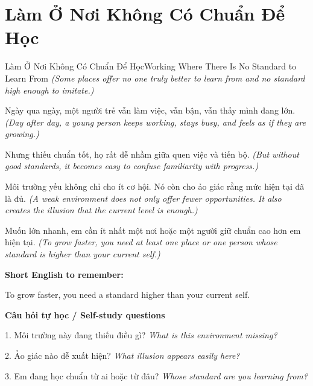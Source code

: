 \section{Làm Ở Nơi Không Có Chuẩn Để Học}
\begin{truyen}{Làm Ở Nơi Không Có Chuẩn Để Học}{Working Where There Is No Standard to Learn From}
\textit{(Some places offer no one truly better to learn from and no standard high enough to imitate.)}

Ngày qua ngày, một người trẻ vẫn làm việc, vẫn bận, vẫn thấy mình đang lớn.
\textit{(Day after day, a young person keeps working, stays busy, and feels as if they are growing.)}

Nhưng thiếu chuẩn tốt, họ rất dễ nhầm giữa quen việc và tiến bộ.
\textit{(But without good standards, it becomes easy to confuse familiarity with progress.)}

Môi trường yếu không chỉ cho ít cơ hội. Nó còn cho ảo giác rằng mức hiện tại đã là đủ.
\textit{(A weak environment does not only offer fewer opportunities. It also creates the illusion that the current level is enough.)}

\end{truyen}

\begin{baihoc}
Muốn lớn nhanh, em cần ít nhất một nơi hoặc một người giữ chuẩn cao hơn em hiện tại.
\textit{(To grow faster, you need at least one place or one person whose standard is higher than your current self.)}
\end{baihoc}

\begin{ghinhoanh}
\textbf{Short English to remember:}

To grow faster, you need a standard higher than your current self.

\end{ghinhoanh}

\begin{tuhocnhanh}
\textbf{Câu hỏi tự học / Self-study questions}

1. Môi trường này đang thiếu điều gì? \textit{What is this environment missing?}

2. Ảo giác nào dễ xuất hiện? \textit{What illusion appears easily here?}

3. Em đang học chuẩn từ ai hoặc từ đâu? \textit{Whose standard are you learning from?}
\end{tuhocnhanh}
\ngancach

